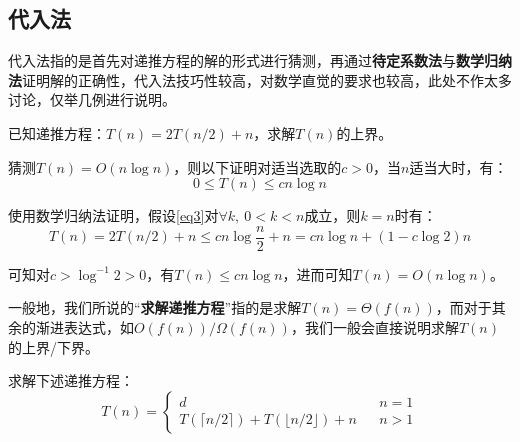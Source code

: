\documentclass[12pt,a4paper,violet]{bbe}
\begin{document}
\subsection{代入法\label{2.4.2}}
代入法指的是首先对递推方程的解的形式进行猜测，再通过\textbf{待定系数法}与\textbf{数学归纳法}证明解的正确性，代入法技巧性较高，对数学直觉的要求也较高，此处不作太多讨论，仅举几例进行说明。
\begin{example}\label{ex2.6}
	已知递推方程：$T(n)=2T(n/2)+n$，求解$T(n)$的上界。
\end{example}
\begin{solution}
	猜测$T(n)=O(n\log n)$，则以下证明对适当选取的$c>0$，当$n$适当大时，有：
	\begin{equation}
		0\leqslant T(n)\leqslant cn\log n
		\label{eq3}
	\end{equation}
	
	使用数学归纳法证明，假设\cref{eq3}对$\forall k,~0<k<n$成立，则$k=n$时有：
	$$
	T(n)=2T(n/2)+n\leqslant cn\log \frac{n}{2}+n=cn\log n+(1-c\log 2)n
	$$
	
	可知对$c>\log^{-1} 2>0$，有$T(n)\leqslant cn\log n$，进而可知$T(n)=O(n\log n)$。
\end{solution}
\begin{remark}
	一般地，我们所说的“\textbf{求解递推方程}”指的是求解$T(n)=\Theta(f(n))$，而对于其余的渐进表达式，如$O(f(n))/\Omega(f(n))$，我们一般会直接说明求解$T(n)$的上界/下界。
\end{remark}
\begin{example}\label{ex2.7}
	求解下述递推方程：
	$$
	T(n)=\left\{\begin{array}{lcc}
		d&&n=1\\
		T(\lceil n/2\rceil)+T(\lfloor n/2\rfloor)+n&&n>1
	\end{array}\right.
	$$
\end{example}
\end{document}
